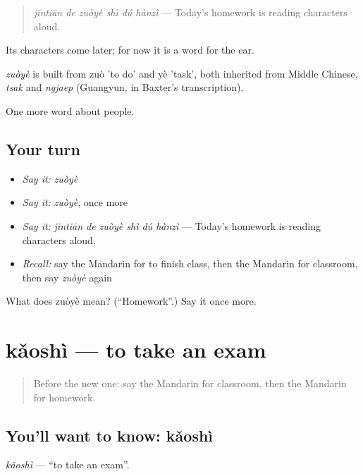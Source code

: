 \begin{quote}
\emph{jīntiān de zuòyè shì dú hànzì} — Today's homework is reading characters aloud.
\end{quote}

Its characters come later; for now it is a word for the ear.

\begin{cousinweb}
\emph{zuòyè} is built from zuò 'to do' and yè 'task', both inherited from Middle Chinese, \emph{tsak} and \emph{ngjaep} (Guangyun, in Baxter's transcription).
\end{cousinweb}

\begin{grammarlens}[title={What you've built}]
One more word about people.
\end{grammarlens}

\subsection*{Your turn}
\begin{itemize}
\raggedright
  \item \emph{Say it:} \emph{zuòyè}
  \item \emph{Say it:} \emph{zuòyè}, once more
  \item \emph{Say it:} \emph{jīntiān de zuòyè shì dú hànzì} — Today's homework is reading characters aloud.
  \item \emph{Recall:} say the Mandarin for to finish class, then the Mandarin for classroom, then say \emph{zuòyè} again
\end{itemize}

\begin{tcolorbox}[breakable,colback=teal!4,colframe=teal!35!black,title={Before you move on}]
What does zuòyè mean? (\textquotedblleft{}Homework\textquotedblright{}.) Say it once more.
\end{tcolorbox}
\section[kǎoshì]{kǎoshì — to take an exam}

\label{lesson:ZH-C79-kaoshi}



\begin{quote}
Before the new one: say the Mandarin for classroom, then the Mandarin for homework.
\end{quote}

\subsection*{You'll want to know: kǎoshì}
\emph{kǎoshì} — \textquotedblleft{}to take an exam\textquotedblright{}.

